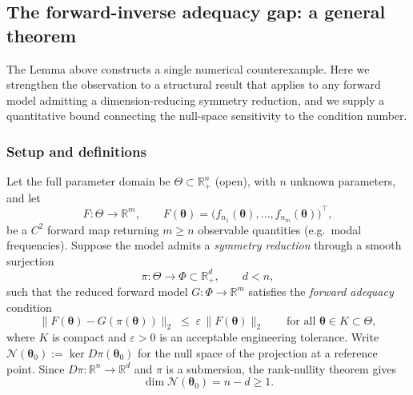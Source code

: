 %
%

\subsection{The forward-inverse adequacy gap: a general theorem}
\label{sec:theorem4}

The Lemma above constructs a single numerical counterexample.  Here we
strengthen the observation to a structural result that applies to any forward
model admitting a dimension-reducing symmetry reduction, and we supply a
quantitative bound connecting the null-space sensitivity to the condition number.

\subsubsection{Setup and definitions}

Let the full parameter domain be $\Theta\subset\mathbb{R}^n_+$ (open), with
$n$ unknown parameters, and let
\begin{equation}
  F:\Theta\to\mathbb{R}^m, \qquad
  F(\boldsymbol{\theta})
  = \bigl(f_{n_1}(\boldsymbol{\theta}),\ldots,f_{n_m}(\boldsymbol{\theta})\bigr)^\top,
  \label{eq:thm4_full_forward}
\end{equation}
be a $C^2$ forward map returning $m\geq n$ observable quantities (e.g.\ modal
frequencies).  Suppose the model admits a \emph{symmetry reduction} through a
smooth surjection
\begin{equation}
  \pi:\Theta\to\Phi\subset\mathbb{R}^d_+, \qquad d<n,
  \label{eq:thm4_projection}
\end{equation}
such that the reduced forward model $G:\Phi\to\mathbb{R}^m$ satisfies the
\emph{forward adequacy} condition
\begin{equation}
  \|F(\boldsymbol{\theta}) - G(\pi(\boldsymbol{\theta}))\|_2
  \;\leq\;
  \varepsilon\,\|F(\boldsymbol{\theta})\|_2
  \qquad\text{for all } \boldsymbol{\theta}\in K\subset\Theta,
  \label{eq:thm4_forward_adequacy}
\end{equation}
where $K$ is compact and $\varepsilon>0$ is an acceptable engineering
tolerance.  Write $\mathcal{N}(\boldsymbol{\theta}_0):=\ker D\pi(\boldsymbol{\theta}_0)$
for the null space of the projection at a reference point.  Since
$D\pi:\mathbb{R}^n\to\mathbb{R}^d$ and $\pi$ is a submersion, the rank-nullity
theorem gives
\begin{equation}
  \dim\mathcal{N}(\boldsymbol{\theta}_0)=n-d\geq 1.
  \label{eq:thm4_null_dimension}
\end{equation}

